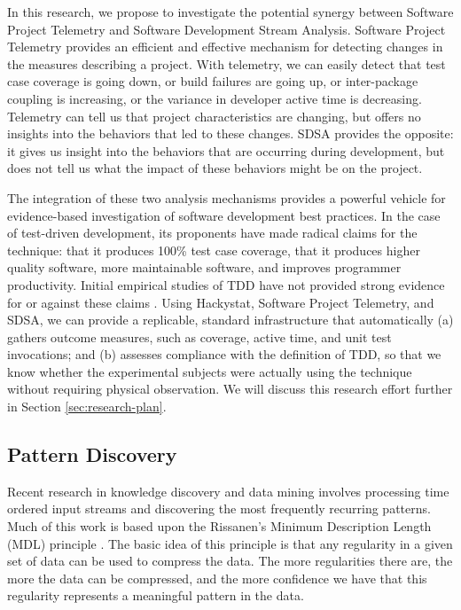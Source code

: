 In this research, we propose to investigate the potential synergy between
Software Project Telemetry and Software Development Stream Analysis.
Software Project Telemetry provides an efficient and effective mechanism
for detecting changes in the measures describing a project.  With
telemetry, we can easily detect that test case coverage is going down, or
build failures are going up, or inter-package coupling is increasing, or
the variance in developer active time is decreasing. Telemetry can tell us
that project characteristics are changing, but offers no insights into the
behaviors that led to these changes.  SDSA provides the opposite: it gives
us insight into the behaviors that are occurring during development, but
does not tell us what the impact of these behaviors might be on the
project.

The integration of these two analysis mechanisms provides a powerful
vehicle for evidence-based investigation of software development best
practices.  In the case of test-driven development, its proponents have
made radical claims for the technique: that it produces 100\% test case
coverage, that it produces higher quality software, more maintainable
software, and improves programmer productivity.  Initial empirical studies
of TDD have not provided strong evidence for or against these claims
\cite{George:03,George:04,Geras:04,Muller:02,Matjaz:03}.  Using Hackystat,
Software Project Telemetry, and SDSA, we can provide a replicable, standard
infrastructure that automatically (a) gathers outcome measures, such as
coverage, active time, and unit test invocations; and (b) assesses
compliance with the definition of TDD, so that we know whether the
experimental subjects were actually using the technique without requiring
physical observation. We will discuss this research effort further in
Section \ref{sec:research-plan}.

\subsection{Pattern Discovery}

Recent research in knowledge discovery and data mining involves processing
time ordered input streams and discovering the most frequently recurring
patterns.  Much of this work is based upon the Rissanen's Minimum Description Length 
(MDL) principle \cite{Rissanen89}.  The basic idea of this principle is that 
any regularity in a given set of data can be used to compress the data.  The
more regularities there are, the more the data can be compressed, and the more 
confidence we have that this regularity represents a meaningful pattern in the data. 

